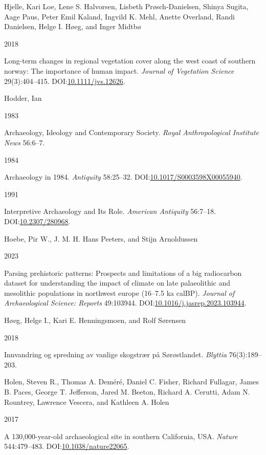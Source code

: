 \documentclass[
  a4paper,
  oneside]{uiophdthesis}
\newlength{\cslhangindent}
\newlength{\csllabelwidth}
\newlength{\cslentryspacingunit} %
\newenvironment{CSLReferences}[2] %
 {%
  \setlength{\parindent}{0pt}
  \ifodd #1
  \let\oldpar\par
  \def\par{\hangindent=\cslhangindent\oldpar}
  \fi
  \setlength{\parskip}{#2\cslentryspacingunit}
 }%
 {}
\newcommand{\CSLBlock}[1]{#1\hfill\break}
\newcommand{\CSLLeftMargin}[1]{\parbox[t]{\csllabelwidth}{#1}}
\newcommand{\CSLRightInline}[1]{\parbox[t]{\linewidth - \csllabelwidth}{#1}\break}
\begin{document}
\begin{CSLReferences}{0}{0}
\leavevmode{}%
\CSLBlock{Hjelle, Kari Loe, Lene S. Halvorsen, Lisbeth Prøsch-Danielsen, Shinya Sugita, Aage Paus, Peter Emil Kaland, Ingvild K. Mehl, Anette Overland, Randi Danielsen, Helge I. Høeg, and Inger Midtbø}
\CSLLeftMargin{ 2018}
\CSLRightInline{Long-term changes in regional vegetation cover along the west coast of southern norway: The importance of human impact. \emph{Journal of Vegetation Science} 29(3):404--415. DOI:\href{https://doi.org/10.1111/jvs.12626}{10.1111/jvs.12626}.}

\leavevmode{}%
\CSLBlock{Hodder, Ian}
\CSLLeftMargin{ 1983}
\CSLRightInline{Archaeology, Ideology and Contemporary Society. \emph{Royal Anthropological Institute News} 56:6--7.}

\leavevmode{}%
\CSLLeftMargin{ 1984 }
\CSLRightInline{Archaeology in 1984. \emph{Antiquity} 58:25--32. DOI:\href{https://doi.org/10.1017/S0003598X00055940}{10.1017/S0003598X00055940}.}

\leavevmode{}%
\CSLLeftMargin{ 1991 }
\CSLRightInline{Interpretive Archaeology and Its Role. \emph{American Antiquity} 56:7--18. DOI:\href{https://doi.org/10.2307/280968}{10.2307/280968}.}

\leavevmode{}%
\CSLBlock{Hoebe, Pir W., J. M. H. Hans Peeters, and Stijn Arnoldussen}
\CSLLeftMargin{ 2023}
\CSLRightInline{Parsing prehistoric patterns: Prospects and limitations of a big radiocarbon dataset for understanding the impact of climate on late palaeolithic and mesolithic populations in northwest europe (16--7.5 ka calBP). \emph{Journal of Archaeological Science: Reports} 49:103944. DOI:\href{https://doi.org/10.1016/j.jasrep.2023.103944}{10.1016/j.jasrep.2023.103944}.}

\leavevmode{}%
\CSLBlock{Høeg, Helge I., Kari E. Henningsmoen, and Rolf Sørensen}
\CSLLeftMargin{ 2018}
\CSLRightInline{{Innvandring og spredning av vanlige skogstrær på Sørøstlandet}. \emph{Blyttia} 76(3):189--203.}

\leavevmode{}%
\CSLBlock{Holen, Steven R., Thomas A. Deméré, Daniel C. Fisher, Richard Fullagar, James B. Paces, George T. Jefferson, Jared M. Beeton, Richard A. Cerutti, Adam N. Rountrey, Lawrence Vescera, and Kathleen A. Holen}
\CSLLeftMargin{ 2017}
\CSLRightInline{A 130,000-year-old archaeological site in southern California, USA. \emph{Nature} 544:479--483. DOI:\href{https://doi.org/10.1038/nature22065}{10.1038/nature22065}.}


\end{CSLReferences}
\end{document}
